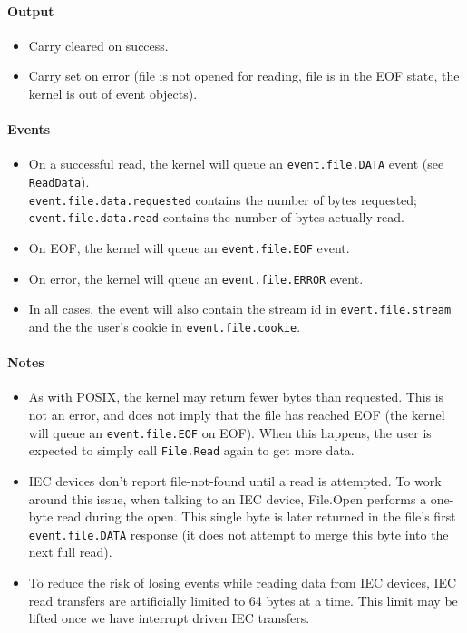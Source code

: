 \paragraph{Output}

\begin{itemize}
\item Carry cleared on success.
\item Carry set on error (file is not opened for reading, file is in the EOF state, the kernel is out of event objects).
\end{itemize}

\paragraph{Events}

\begin{itemize}
\item On a successful read, the kernel will queue an \verb+event.file.DATA+ event (see \verb+ReadData+). \\ \verb+event.file.data.requested+ contains the number of bytes requested;  \verb+event.file.data.read+ contains the number of bytes actually read.
\item On EOF, the kernel will queue an \verb+event.file.EOF+ event.
\item On error, the kernel will queue an \verb+event.file.ERROR+ event.
\item In all cases, the event will also contain the stream id in \verb+event.file.stream+ and the the user's cookie in \verb+event.file.cookie+.
\end{itemize}

\paragraph{Notes}

\begin{itemize}
\item As with POSIX, the kernel may return fewer bytes than requested.  This is not an error, and does not imply that the file has reached EOF (the kernel will queue an \verb+event.file.EOF+ on EOF).  When this happens, the user is expected to simply call \verb+File.Read+ again to get more data.

\item IEC devices don't report file-not-found until a read is attempted.  To work around this issue, when talking to an IEC device, File.Open performs a one-byte read during the open.  This single byte is later returned in the file's first \verb+event.file.DATA+ response (it does not attempt to merge this byte into the next full read).  

\item To reduce the risk of losing events while reading data from IEC devices, IEC read transfers are artificially limited to 64 bytes at a time.  This limit may be lifted once we have interrupt driven IEC transfers.
\end{itemize}

